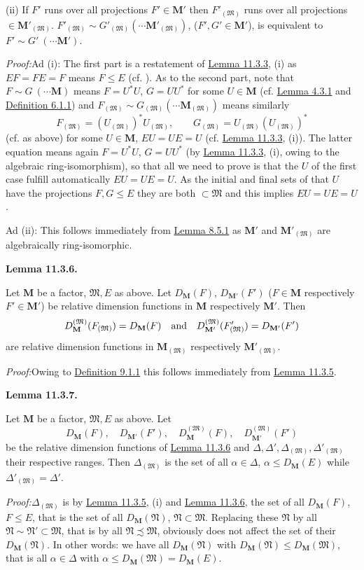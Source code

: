 \documentclass[12pt,b5paper,twoside]{article}
\newcommand{\M}{\mathbf M}
\newcommand{\Lemma}[1]{%
  \par\smallskip\noindent\phantomsection\label{lem:#1}\textbf{Lemma #1.}\enspace
}
\newcommand{\Proof}{\par\noindent\textit{Proof:}\enspace}
\newcommand{\defref}[1]{\hyperref[def:#1]{Definition #1}}
\newcommand{\lemref}[1]{\hyperref[lem:#1]{Lemma #1}}
\begin{document}
(ii) If $F'$ runs over all projections $F'\in\M'$ then
$F'_{(\mathfrak M)}$ runs over all projections
$\in\M'_{(\mathfrak M)}$.
$F'_{(\mathfrak M)}\sim G'_{(\mathfrak M)}
(\cdots\M'_{(\mathfrak M)})$, ($F',G'\in\M'$), is equivalent to
$F'\sim G'\ (\cdots\M')$.

\Proof Ad (i): The first part is a restatement of \lemref{11.3.3}, (i) as
$EF=FE=F$ means $F\leq E$ (cf. \cite[p.~76]{ref16}). As to the second
part, note that $F\sim G\ (\cdots\M)$ means $F=U^*U$, $G=UU^*$ for some
$U\in\M$ (cf. \lemref{4.3.1} and \defref{6.1.1}) and
$F_{(\mathfrak M)}\sim G_{(\mathfrak M)}
(\cdots\M_{(\mathfrak M)})$ means similarly
\[
 F_{(\mathfrak M)}=(U_{(\mathfrak M)})^*U_{(\mathfrak M)},
 \qquad
 G_{(\mathfrak M)}=U_{(\mathfrak M)}(U_{(\mathfrak M)})^*
\]
(cf. as above) for some $U\in\M$, $EU=UE=U$ (cf.
\lemref{11.3.3}, (i)). The latter equation means again $F=U^*U$,
$G=UU^*$ (by \lemref{11.3.3}, (i), owing to the algebraic
ring-isomorphism), so that all we need to prove is that the $U$ of the
first case fulfill automatically $EU=UE=U$. As the initial and final sets
of that $U$ have the projections $F,G\leq E$ they are both
$\subset\mathfrak M$ and this implies $EU=UE=U$.

Ad (ii): This follows immediately from \lemref{8.5.1} as $\M'$ and
$\M'_{(\mathfrak M)}$ are algebraically ring-isomorphic.

\Lemma{11.3.6}
Let $\M$ be a factor, $\mathfrak M,E$ as above. Let
$D_{\M}(F)$, $D_{\M'}(F')$ ($F\in\M$ respectively $F'\in\M'$) be relative
dimension functions in $\M$ respectively $\M'$. Then
\[
 D_{\M}^{(\mathfrak M)}(F_{(\mathfrak M)})=D_{\M}(F)
 \quad\hbox{and}\quad
 D_{\M'}^{(\mathfrak M)}(F'_{(\mathfrak M)})=D_{\M'}(F')
\]
are relative dimension functions in $\M_{(\mathfrak M)}$ respectively
$\M'_{(\mathfrak M)}$.

\Proof Owing to \defref{9.1.1} this follows immediately from
\lemref{11.3.5}.

\Lemma{11.3.7}
Let $\M$ be a factor, $\mathfrak M,E$ as above. Let
\[
 D_{\M}(F),\quad D_{\M'}(F'),\quad
 D_{\M}^{(\mathfrak M)}(F),\quad D_{\M'}^{(\mathfrak M)}(F')
\]
be the relative dimension functions of \lemref{11.3.6} and
$\Delta,\Delta',\Delta_{(\mathfrak M)},\Delta'_{(\mathfrak M)}$ their
respective ranges. Then $\Delta_{(\mathfrak M)}$ is the set of all
$\alpha\in\Delta$, $\alpha\leq D_{\M}(E)$ while
$\Delta'_{(\mathfrak M)}=\Delta'$.

\Proof $\Delta_{(\mathfrak M)}$ is by \lemref{11.3.5}, (i) and
\lemref{11.3.6}, the set of all $D_{\M}(F)$, $F\leq E$, that is the set of
all $D_{\M}(\mathfrak N)$, $\mathfrak N\subset\mathfrak M$. Replacing
these $\mathfrak N$ by all
$\mathfrak N\sim\mathfrak N'\subset\mathfrak M$, that is by all
$\mathfrak N\precsim\mathfrak M$, obviously does not affect the set of
their $D_{\M}(\mathfrak N)$. In other words: we have all
$D_{\M}(\mathfrak N)$ with
$D_{\M}(\mathfrak N)\leq D_{\M}(\mathfrak M)$, that is all
$\alpha\in\Delta$ with
$\alpha\leq D_{\M}(\mathfrak M)=D_{\M}(E)$.
\end{document}
